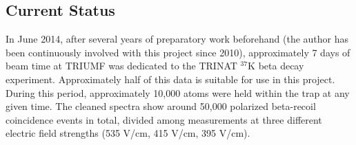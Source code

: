 %
%

%
\subsection{Current Status}
\label{status}
In June 2014, after several years of preparatory work beforehand (the author has been continuously involved with this project since 2010), approximately 7 days of beam time at TRIUMF was dedicated to the TRINAT $^{37}\textrm{K}$ beta decay experiment.  Approximately half of this data is suitable for use in this project.  During this period, approximately 10,000 atoms were held within the trap at any given time.  The cleaned spectra show around 50,000 polarized beta-recoil coincidence events in total, divided among measurements at three different electric field strengths (535 V/cm, 415 V/cm, 395 V/cm). 


